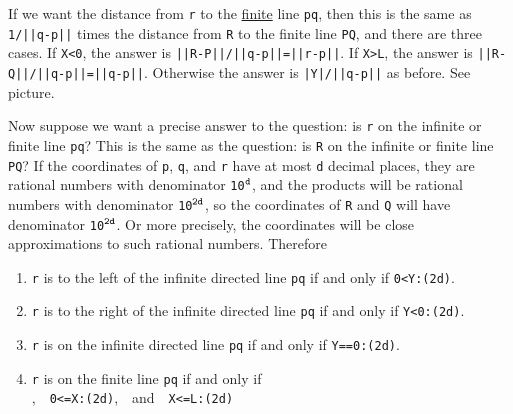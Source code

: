 \documentclass[12pt]{article}
\begin{document}
\begin{minipage}{\textwidth}\raggedright
\begin{wrapfigure}{r}{0.53\textwidth}
\end{wrapfigure}
If we want the distance from {\tt r} to the \underline{finite} line {\tt pq},
then this is the same as {\tt 1/||q-p||} times
the distance from {\tt R} to the finite
line {\tt PQ}, and there are three cases.
If {\tt X<0}, the answer
is {\small \tt ||R-P||/||q-p||=||r-p||}.  If {\tt X>L},
the answer is {\small \tt ||R-Q||/||q-p||=||q-p||}.
Otherwise the answer is {\small \tt |Y|/||q-p||} as before.
See picture.
\end{minipage}

Now suppose we want a precise answer to the question: is {\tt r}
on the infinite or finite line {\tt pq}?  This is the same as the question:
is {\tt R} on the infinite or finite line {\tt PQ}?
If the coordinates of {\tt p}, {\tt q}, and {\tt r} have at
most {\tt d} decimal places, they are rational numbers with
denominator {\tt 10$^{\tt d}$}, and the products will be rational
numbers with denominator {\tt 10$^{\tt 2d}$}, so the coordinates of
{\tt R} and {\tt Q} will have denominator {\tt 10$^{\tt 2d}$}.
Or more precisely,
the coordinates will be close approximations to such rational numbers.
Therefore
\begin{enumerate}
\item {\tt r} is to the left of the infinite directed line {\tt pq}
if and only if {\tt 0<Y:(2d)}.
\item {\tt r} is to the right of the infinite directed line {\tt pq}
if and only if {\tt Y<0:(2d)}.
\item {\tt r} is on the infinite directed line {\tt pq}
if and only if {\tt Y==0:(2d)}.
\item {\tt r} is on the finite line {\tt pq} if and only if \\
\hspace*{0.3in}{\tt Y==0:(2d)},~~{\tt 0<=X:(2d)},~~and~~{\tt X<=L:(2d)}
\end{enumerate}
\end{document}
